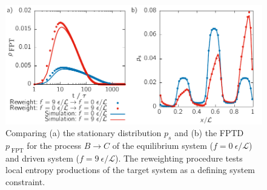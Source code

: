   \begin{figure}[t]
 \centering
 \includegraphics{../plots/Jaynes/fpt_Sloc_2010_2910.pdf}
 \caption[Stationary distribution and first-passage time distribution for the driven 1D system reweighted with respect to local entropy production.]{Comparing (a) the stationary distribution $p_s$ and (b) the FPTD $p_{\; \text{FPT}}$ for the process $B \rightarrow C$ of the equilibrium system ($f=0~\epsilon / \mathcal{L}$) and driven system ($f=9~\epsilon / \mathcal{L}$). The reweighting procedure tests local entropy productions of the target system as a defining system constraint.}
 \label{fig:rewtrial2}
\end{figure}
